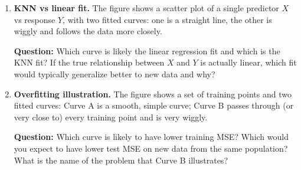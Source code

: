 \documentclass[11pt]{article}
\begin{document}
\begin{enumerate}[leftmargin=*, resume]
\item \textbf{KNN vs linear fit.} The figure shows a scatter plot of a single predictor $X$ vs response $Y$, with two fitted curves: one is a straight line, the other is wiggly and follows the data more closely.
\begin{center}
\end{center}
\textbf{Question:} Which curve is likely the linear regression fit and which is the KNN fit? If the true relationship between $X$ and $Y$ is actually linear, which fit would typically generalize better to new data and why?

\item \textbf{Overfitting illustration.} The figure shows a set of training points and two fitted curves: Curve A is a smooth, simple curve; Curve B passes through (or very close to) every training point and is very wiggly.
\begin{center}
\end{center}
\textbf{Question:} Which curve is likely to have lower training MSE? Which would you expect to have lower test MSE on new data from the same population? What is the name of the problem that Curve B illustrates?

\end{enumerate}
\end{document}
